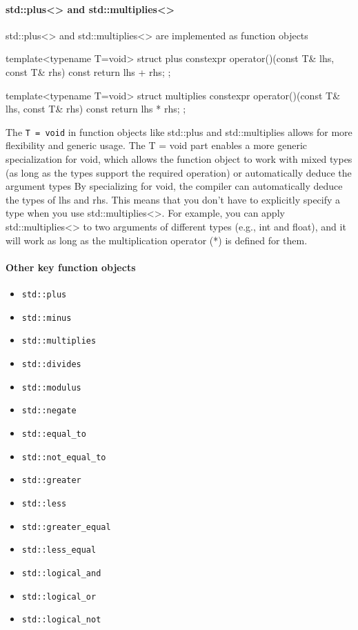 \documentclass{report}
\begin{document}
   \paragraph{std::plus<> and std::multiplies<>}
   \bigbreak \noindent \bigbreak \noindent 
   std::plus<> and std::multiplies<> are implemented as function objects
   \bigbreak \noindent 
   \begin{cppcode}
   template<typename T=void>
   struct plus {
       constexpr operator()(const T& lhs, const T& rhs) const {
           return lhs + rhs;
       }
   };

   template<typename T=void>
   struct multiplies {
       constexpr operator()(const T& lhs, const T& rhs) const {
           return lhs * rhs;
       }
   };
   \end{cppcode}
   \bigbreak \noindent 
   The \texttt{T = void} in function objects like std::plus and std::multiplies allows for more flexibility and generic usage.
   \bigbreak \noindent 
   The T = void part enables a more generic specialization for void, which allows the function object to work with mixed types (as long as the types support the required operation) or automatically deduce the argument types
   \bigbreak \noindent 
   By specializing for void, the compiler can automatically deduce the types of lhs and rhs. This means that you don’t have to explicitly specify a type when you use std::multiplies<>. For example, you can apply std::multiplies<> to two arguments of different types (e.g., int and float), and it will work as long as the multiplication operator (*) is defined for them.

   \bigbreak \noindent 
   \paragraph{Other key function objects}
   \bigbreak \noindent  \bigbreak \noindent 
   \begin{itemize}
       \item \texttt{std::plus}
       \item \texttt{std::minus}
       \item \texttt{std::multiplies}
       \item \texttt{std::divides}
       \item \texttt{std::modulus}
       \item \texttt{std::negate}
       \item \texttt{std::equal\_to}
       \item \texttt{std::not\_equal\_to}
       \item \texttt{std::greater}
       \item \texttt{std::less}
       \item \texttt{std::greater\_equal}
       \item \texttt{std::less\_equal}
       \item \texttt{std::logical\_and}
       \item \texttt{std::logical\_or}
       \item \texttt{std::logical\_not}
   \end{itemize}
\end{document}
